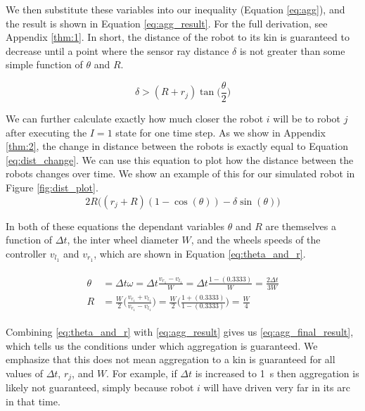 \documentclass[conference]{IEEEtran}
\begin{document}
    We then substitute these variables into our inequality (Equation \ref{eq:agg}), and the result is shown in Equation \ref{eq:agg_result}. For the full derivation, see Appendix \ref{thm:1}. In short, the distance of the robot to its kin is guaranteed to decrease until a point where the sensor ray distance $\delta$ is not greater than some simple function of $\theta$ and $R$.

    \begin{equation} \label{eq:agg_result}
      \delta > (R + r_j)\tan\bigg(\frac{\theta}{2}\bigg)
    \end{equation}

    We can further calculate exactly how much closer the robot $i$ will be to robot $j$ after executing the $I=1$ state for one time step. As we show in Appendix \ref{thm:2}, the change in distance between the robots is exactly equal to Equation \ref{eq:dist_change}. We can use this equation to plot how the distance between the robots changes over time. We show an example of this for our simulated robot in Figure \ref{fig:dist_plot}.
    \begin{equation} \label{eq:dist_change}
      2R\big((r_j + R)(1 - \cos(\theta))-\delta\sin(\theta)\big)
    \end{equation}

    In both of these equations the dependant variables $\theta$ and $R$ are themselves a function of $\Delta t$, the inter wheel diameter $W$, and the wheels speeds of the controller $v_{l_1}$ and $v_{r_1}$, which are shown in Equation \ref{eq:theta_and_r}.

    \begin{align}
      \begin{split} \label{eq:theta_and_r}
        \theta &= \Delta t\omega = \Delta t \frac{v_{r_1} - v_{l_1}}{W} = \Delta t \frac{1 - (0.3333)}{W} = \frac{2\Delta t}{3W} \\
        R &= \frac{W}{2}\bigg(\frac{v_{r_1} + v_{l_1}}{v_{r_1} - v_{l_1}}\bigg) = \frac{W}{2}\bigg(\frac{1 + (0.3333)}{1 - (0.3333)}\bigg) = \frac{W}{4}
      \end{split}
    \end{align}

    Combining \ref{eq:theta_and_r} with \ref{eq:agg_result} gives us \ref{eq:agg_final_result}, which tells us the conditions under which aggregation is guaranteed. We emphasize that this does not mean aggregation to a kin is guaranteed for all values of $\Delta t$, $r_j$, and $W$. For example, if $\Delta t$ is increased to \SI{1}{\second} then aggregation is likely not guaranteed, simply because robot $i$ will have driven very far in its arc in that time.
\end{document}
